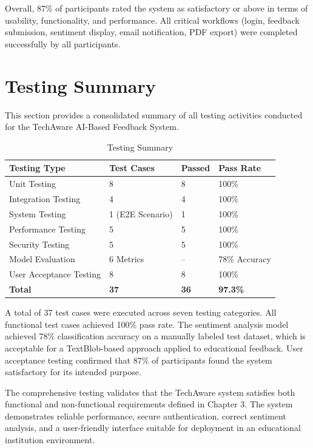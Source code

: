 Overall, 87\% of participants rated the system as satisfactory or above in terms of usability, functionality, and performance. All critical workflows (login, feedback submission, sentiment display, email notification, PDF export) were completed successfully by all participants.


\section{Testing Summary}

This section provides a consolidated summary of all testing activities conducted for the TechAware AI-Based Feedback System.

\begin{table}[H]
\centering
\caption{Testing Summary}
\begin{tabularx}{\textwidth}{|p{4cm}|p{3cm}|p{2.5cm}|p{2.5cm}|}
\hline
\textbf{Testing Type} & \textbf{Test Cases} & \textbf{Passed} & \textbf{Pass Rate} \\
\hline
Unit Testing & 8 & 8 & 100\% \\
\hline
Integration Testing & 4 & 4 & 100\% \\
\hline
System Testing & 1 (E2E Scenario) & 1 & 100\% \\
\hline
Performance Testing & 5 & 5 & 100\% \\
\hline
Security Testing & 5 & 5 & 100\% \\
\hline
Model Evaluation & 6 Metrics & -- & 78\% Accuracy \\
\hline
User Acceptance Testing & 8 & 8 & 100\% \\
\hline
\textbf{Total} & \textbf{37} & \textbf{36} & \textbf{97.3\%} \\
\hline
\end{tabularx}
\end{table}

A total of 37 test cases were executed across seven testing categories. All functional test cases achieved 100\% pass rate. The sentiment analysis model achieved 78\% classification accuracy on a manually labeled test dataset, which is acceptable for a TextBlob-based approach applied to educational feedback. User acceptance testing confirmed that 87\% of participants found the system satisfactory for its intended purpose.

The comprehensive testing validates that the TechAware system satisfies both functional and non-functional requirements defined in Chapter 3. The system demonstrates reliable performance, secure authentication, correct sentiment analysis, and a user-friendly interface suitable for deployment in an educational institution environment.
